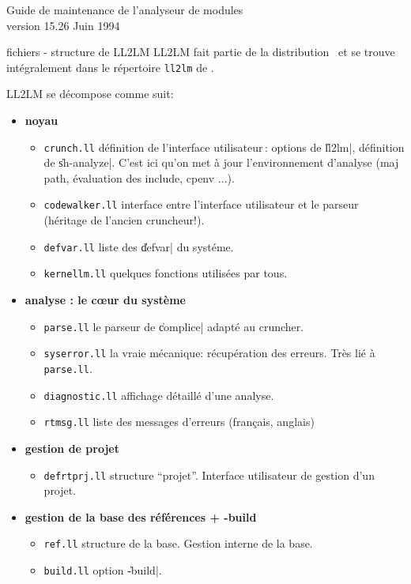 
\Begin

{Guide de maintenance de l'analyseur de modules \\
{\sf version 15.26}} 
{Juin 1994}

 {fichiers - structure de LL2LM}
LL2LM fait partie de la distribution \LeLisp\ et se trouve
int\'{e}gralement dans le r\'{e}pertoire {\tt ll2lm} de \LeLisp .

LL2LM se d\'{e}compose comme suit:
\begin{itemize}

\item{\bf noyau}
\begin{itemize}
\item{\tt crunch.ll}
d\'{e}finition de l'interface utilisateur\,: options de \|ll2lm|,
d\'{e}finition de \|sh-analyze|. C'est ici qu'on met \`{a} jour
l'environnement d'analyse (maj path, \'{e}valuation des include, cpenv ...).
\item{\tt codewalker.ll}
interface entre l'interface utilisateur et le parseur (h\'{e}ritage de
l'ancien cruncheur!).
\item{\tt defvar.ll}
liste des \|defvar| du syst\'{e}me.
\item{\tt kernellm.ll}
quelques fonctions utilis\'{e}es par tous.
\end{itemize}

\item{\bf analyse : le c\oe ur du syst\`{e}me}
\begin{itemize}
\item{\tt parse.ll}
le parseur de \|complice| adapt\'{e} au cruncher.
\item{\tt syserror.ll}
la vraie m\'{e}canique: r\'{e}cup\'{e}ration des erreurs. Tr\`{e}s li\'{e} \`{a} {\tt parse.ll}.
\item{\tt diagnostic.ll}
affichage d\'{e}taill\'{e} d'une analyse.
\item{\tt rtmsg.ll}
liste des messages d'erreurs (fran\c{c}ais, anglais)
\end{itemize}

\item{\bf gestion de projet}
\begin{itemize}
\item{\tt defrtprj.ll}
structure ``projet{''}. Interface utilisateur de gestion d'un projet.
\end{itemize}

\item{\bf gestion de la base des r\'{e}f\'{e}rences + -build}
\begin{itemize}
\item{\tt ref.ll}
structure de la base. Gestion interne de la base.
\item{\tt build.ll}
option \|-build|.
\end{itemize}


\end{itemize}
